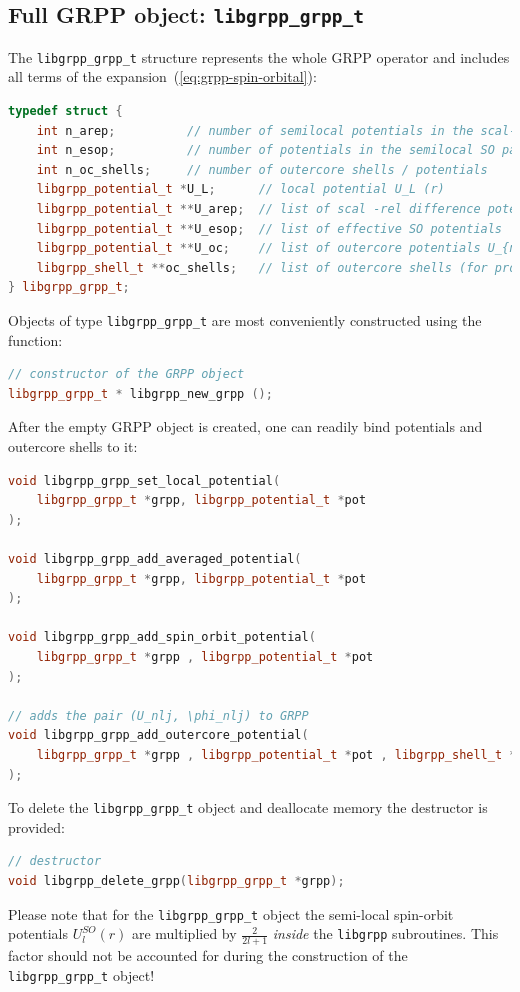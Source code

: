 \documentclass[12pt]{article}
\begin{document}
\subsection{Full GRPP object: \texttt{libgrpp\_grpp\_t}}
\label{sec:grpp-object}

The \texttt{libgrpp\_grpp\_t} structure represents the whole GRPP operator and includes all terms of the expansion~(\ref{eq:grpp-spin-orbital}):
%
\begin{lstlisting}[language=C++]
typedef struct {
    int n_arep;          // number of semilocal potentials in the scal-rel part
    int n_esop;          // number of potentials in the semilocal SO part
    int n_oc_shells;     // number of outercore shells / potentials
    libgrpp_potential_t *U_L;      // local potential U_L (r)
    libgrpp_potential_t **U_arep;  // list of scal -rel difference potentials
    libgrpp_potential_t **U_esop;  // list of effective SO potentials
    libgrpp_potential_t **U_oc;    // list of outercore potentials U_{n_c,lj}
    libgrpp_shell_t **oc_shells;   // list of outercore shells (for projectors)
} libgrpp_grpp_t;
\end{lstlisting}
%
Objects of type \texttt{libgrpp\_grpp\_t} are most conveniently constructed using the function:
%
\begin{lstlisting}[language=C++]
// constructor of the GRPP object
libgrpp_grpp_t * libgrpp_new_grpp ();
\end{lstlisting}
%
After the empty GRPP object is created, one can readily bind potentials and outercore shells to it:
%
\begin{lstlisting}[language=C++]
void libgrpp_grpp_set_local_potential(
    libgrpp_grpp_t *grpp, libgrpp_potential_t *pot
);

void libgrpp_grpp_add_averaged_potential(
    libgrpp_grpp_t *grpp, libgrpp_potential_t *pot
);

void libgrpp_grpp_add_spin_orbit_potential(
    libgrpp_grpp_t *grpp , libgrpp_potential_t *pot
);

// adds the pair (U_nlj, \phi_nlj) to GRPP
void libgrpp_grpp_add_outercore_potential(
    libgrpp_grpp_t *grpp , libgrpp_potential_t *pot , libgrpp_shell_t *oc_shell
);
\end{lstlisting}
%
To delete the \texttt{libgrpp\_grpp\_t} object and deallocate memory the destructor is provided:
%
\begin{lstlisting}[language=C++]
// destructor
void libgrpp_delete_grpp(libgrpp_grpp_t *grpp);
\end{lstlisting}
%
Please note that for the \texttt{libgrpp\_grpp\_t} object the semi-local spin-orbit potentials $U^{SO}_l(r)$ are multiplied by $\frac{2}{2l+1}$ \textit{inside} the \texttt{libgrpp} subroutines. This factor should not be accounted for during the construction of the \texttt{libgrpp\_grpp\_t} object!
\end{document}
